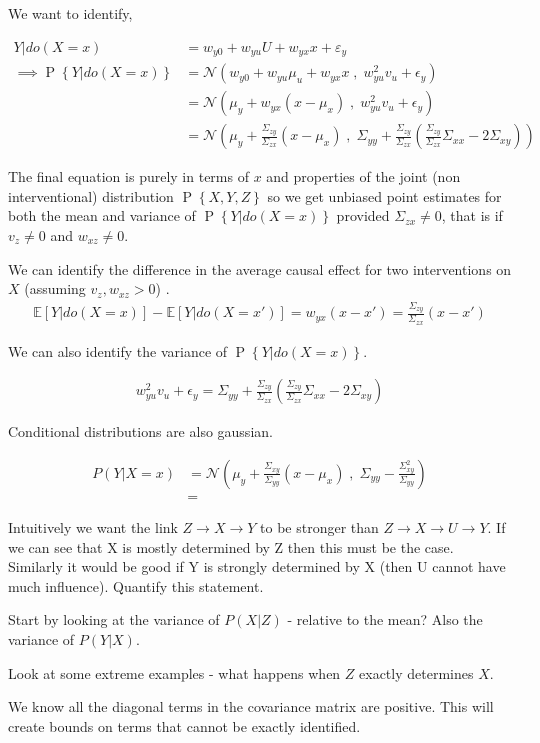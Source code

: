 \documentclass{article}
\newcommand{\E}[1]{\mathbb E\left[#1\right]}
\newcommand{\eq}[1]{\begin{align*}#1\end{align*}}
\renewcommand{\P}[1]{\operatorname{P}\left\{#1\right\}}
\newcommand{\N}[2]{\mathcal{N}\left({#1}\;,\;{#2}\right)}
\theoremstyle{plain}
\theoremstyle{definition}
\begin{document}
We want to identify,

\eq{
Y|do(X=x) &= w_{y0}+w_{yu}U+w_{yx}x+\varepsilon_y  \\
\implies \P{Y|do(X=x)} &=\N{w_{y0}+w_{yu}\mu_u+w_{yx}x}{w_{yu}^2 v_u+\epsilon_y}\\
&=\N{\mu_y+w_{yx}(x-\mu_x)}{w_{yu}^2 v_u+\epsilon_y}\\
&= \N{\mu_y+ \frac{\Sigma_{zy}}{\Sigma_{zx}}(x-\mu_x)}{\Sigma_{yy} + \frac{\Sigma_{zy}}{\Sigma_{zx}}\left(\frac{\Sigma_{zy}}{\Sigma_{zx}}\Sigma_{xx} - 2\Sigma_{xy} \right)}
}

The final equation is purely in terms of $x$ and properties of the joint (non interventional) distribution $\P{X,Y,Z}$ so we get unbiased point estimates for both the mean and variance of $\P{Y|do(X=x)}$ provided $\Sigma_{zx} \neq 0$, that is if $v_z \neq 0$ and $w_{xz} \neq 0$. 

We can identify the difference in the average causal effect for two interventions on $X$ (assuming $v_z,w_{xz} > 0$) .
\eq{
\E{Y|do(X=x)} - \E{Y|do(X=x')} = w_{yx}(x-x') = \frac{\Sigma_{zy}}{\Sigma_{zx}}(x-x')
}

We can also identify the variance of $\P{Y|do(X=x)}$.

\eq{
w_{yu}^2 v_u+\epsilon_y = \Sigma_{yy} + \frac{\Sigma_{zy}}{\Sigma_{zx}}\left(\frac{\Sigma_{zy}}{\Sigma_{zx}}\Sigma_{xx} - 2\Sigma_{xy} \right)
}

Conditional distributions are also gaussian.

\eq{
P(Y|X=x) &= \N{\mu_y+\frac{\Sigma_{xy}}{\Sigma_{yy}}(x-\mu_x)}{\Sigma_{yy} - \frac{\Sigma_{xy}^2}{\Sigma_{yy}}} \\
 &= 
}

Intuitively we want the link $Z \rightarrow X \rightarrow Y$ to be stronger than $Z \rightarrow X\rightarrow U \rightarrow Y$. If we can see that X is mostly determined by Z then this must be the case. Similarly it would be good if Y is strongly determined by X (then U cannot have much influence). Quantify this statement.

Start by looking at the variance of $P(X|Z)$ - relative to the mean?
Also the variance of $P(Y|X)$. 

Look at some extreme examples - what happens when $Z$ exactly determines $X$. 

We know all the diagonal terms in the covariance matrix are positive. This will create bounds on terms that cannot be exactly identified.
\end{document}
